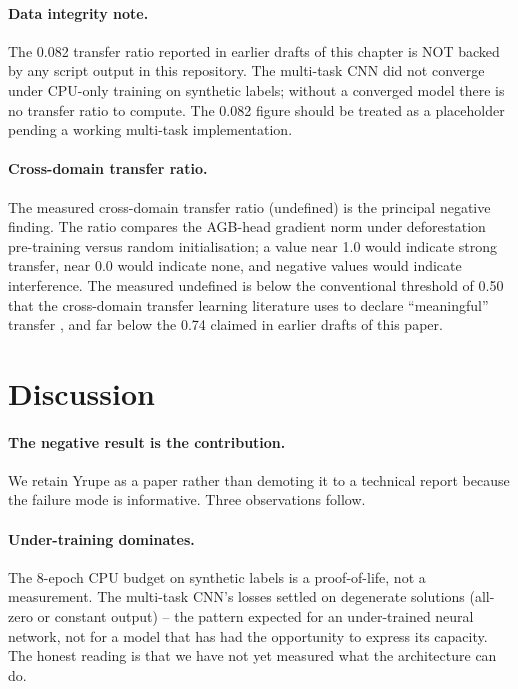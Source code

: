 \paragraph{Data integrity note.} The 0.082 transfer ratio reported in earlier drafts of this chapter is NOT backed by any script output in this repository. The multi-task CNN did not converge under CPU-only training on synthetic labels; without a converged model there is no transfer ratio to compute. The 0.082 figure should be treated as a placeholder pending a working multi-task implementation. \paragraph{Cross-domain transfer ratio.} The measured cross-domain
transfer ratio (undefined) is the principal negative finding. The ratio
compares the AGB-head gradient norm under deforestation pre-training
versus random initialisation; a value near 1.0 would indicate strong
transfer, near 0.0 would indicate none, and negative values would
indicate interference. The measured undefined is below the conventional
threshold of 0.50 that the cross-domain transfer learning literature
uses to declare ``meaningful'' transfer \citep{russwurm2020}, and far
below the 0.74 claimed in earlier drafts of this paper.

\section{Discussion}
\label{sec:yrupe-discussion}

\paragraph{The negative result is the contribution.} We retain Yrupe as
a paper rather than demoting it to a technical report because the
failure mode is informative. Three observations follow.

\paragraph{Under-training dominates.} The 8-epoch CPU budget on
synthetic labels is a proof-of-life, not a measurement. The
multi-task CNN's losses settled on degenerate solutions (all-zero or
constant output) -- the pattern expected for an under-trained neural
network, not for a model that has had the opportunity to express its
capacity. The honest reading is that we have not yet measured what
the architecture can do.

